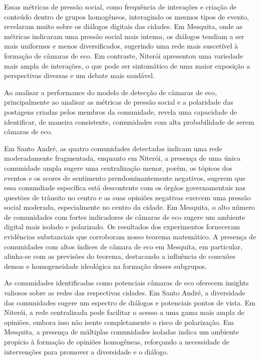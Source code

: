 Essas métricas de pressão social, como frequência de interações e criação de conteúdo dentro de grupos homogêneos, interagindo os mesmos tipos de evento, revelaram muito sobre os diálogos digitais das cidades. Em Mesquita, onde as métricas indicaram uma pressão social mais intensa, os diálogos tendiam a ser mais uniformes e menos diversificados, sugerindo uma rede mais suscetível à formação de câmaras de eco. Em contraste, Niterói apresentou uma variedade mais ampla de interações, o que pode ser sintomático de uma maior exposição a perspectivas diversas e um debate mais saudável.

Ao analisar a performance do modelo de detecção de câmaras de eco, principalmente ao analisar as métricas de pressão social e a polaridade das postagens criadas pelos membros da comunidade, revela uma capacidade de identificar, de maneira consistente, comunidades com alta probabilidade de serem câmaras de eco. 

Em Santo André, as quatro comunidades detectadas indicam uma rede moderadamente fragmentada, enquanto em Niterói, a presença de uma única comunidade ampla sugere uma centralização menor, porém, os tópicos dos eventos e os scores de sentimento prendominantemente negativos, sugerem que essa comundiade específica está descontente com os órgãos governamentais nas questões de trânsito no centro e as suas opiniões negativas exercem uma pressão social moderada, especialmente no centro da cidade. Em Mesquita, o alto número de comunidades com fortes indicadores de câmaras de eco sugere um ambiente digital mais isolado e polarizado. Os resultados dos experimentos forneceram evidências substanciais que corroboram nosso teorema matemático. A presença de comunidades com altos índices de câmara de eco em Mesquita, em particular, alinha-se com as previsões do teorema, destacando a influência de conexões densas e homogeneidade ideológica na formação desses subgrupos.

As comunidades identificadas como potenciais câmaras de eco oferecem insights valiosos sobre as redes das respectivas cidades. Em Santo André, a diversidade das comunidades sugere um espectro de diálogos e potenciais pontos de vista. Em Niterói, a rede centralizada pode facilitar o acesso a uma gama mais ampla de opiniões, embora isso não isente completamente o risco de polarização. Em Mesquita, a presença de múltiplas comunidades isoladas indica um ambiente propício à formação de opiniões homogêneas, reforçando a necessidade de intervenções para promover a diversidade e o diálogo.

